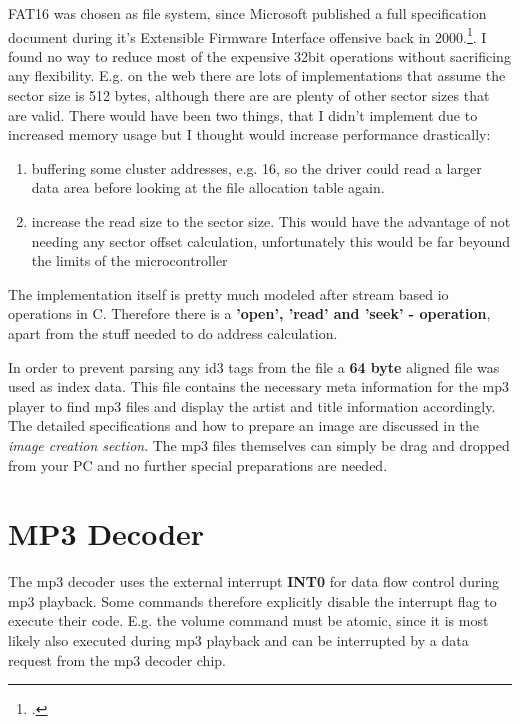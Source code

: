 \documentclass[12pt,a4paper,titlepage,oneside]{article}
\begin{document}
FAT16 was chosen as file system, since Microsoft published a full specification document during it's Extensible Firmware Interface offensive back in 2000.\footcite{FAT16}. I found no way to reduce most of the expensive 32bit operations without sacrificing any flexibility. E.g. on the web there are lots of implementations that assume the sector size is 512 bytes, although there are are plenty of other sector sizes that are valid. There would have been two things, that I didn't implement due to increased memory usage but I thought would increase performance drastically:

\begin{enumerate}
	\item buffering some cluster addresses, e.g. 16, so the driver could read a larger data area before looking at the file allocation table again.
	\item increase the read size to the sector size. This would have the advantage of not needing any sector offset calculation, unfortunately this would be far beyound the limits of the microcontroller  
\end{enumerate}

The implementation itself is pretty much modeled after stream based io operations in C. Therefore there is a {\bf 'open', 'read' and 'seek' - operation}, apart from the stuff needed to do address calculation.

In order to prevent parsing any id3 tags from the file a {\bf 64 byte} aligned file was used as index data. This file contains the necessary meta information for the mp3 player to find mp3 files and display the artist and title information accordingly. The detailed specifications and how to prepare an image are discussed in the { \it image creation section}. The mp3 files themselves can simply be drag and dropped from your PC and no further special preparations are needed. 

\section{MP3 Decoder}

The mp3 decoder uses the external interrupt {\bf INT0} for data flow control during mp3 playback. Some commands therefore explicitly disable the interrupt flag to execute their code. E.g. the volume command must be atomic, since it is most likely also executed during mp3 playback and can be interrupted by a data request from the mp3 decoder chip.
\end{document}
